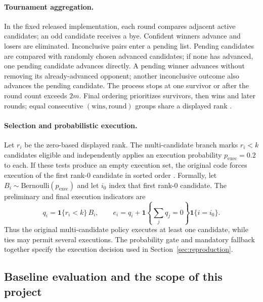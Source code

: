 \documentclass{article}
\begin{document}
\paragraph{Tournament aggregation.}
In the fixed released implementation, each round compares adjacent active candidates; an odd candidate receives a bye. Confident winners advance and losers are eliminated. Inconclusive pairs enter a pending list. Pending candidates are compared with randomly chosen advanced candidates; if none has advanced, one pending candidate advances directly. A pending winner advances without removing its already-advanced opponent; another inconclusive outcome also advances the pending candidate. The process stops at one survivor or after the round count exceeds $2m$. Final ordering prioritizes survivors, then wins and later rounds; equal consecutive $(\text{wins},\text{round})$ groups share a displayed rank \citep{foreagentcode}.

\paragraph{Selection and probabilistic execution.}
Let $r_i$ be the zero-based displayed rank. The multi-candidate branch marks $r_i<k$ candidates eligible and independently applies an execution probability $p_{\mathrm{exec}}=0.2$ to each. If these tests produce an empty execution set, the original code forces execution of the first rank-0 candidate in sorted order \citep{foreagentcode}. Formally, let $B_i\sim\mathrm{Bernoulli}(p_{\mathrm{exec}})$ and let $i_0$ index that first rank-0 candidate. The preliminary and final execution indicators are
\begin{equation}
  q_i=\mathbf{1}\{r_i<k\}\,B_i,\qquad
  e_i=q_i+\mathbf{1}\!\left\{\sum_jq_j=0\right\}\mathbf{1}\{i=i_0\}.
  \label{eq:execute}
\end{equation}
Thus the original multi-candidate policy executes at least one candidate, while ties may permit several executions. The probability gate and mandatory fallback together specify the execution decision used in Section~\ref{sec:reproduction}.

\subsection{Baseline evaluation and the scope of this project}
\end{document}
